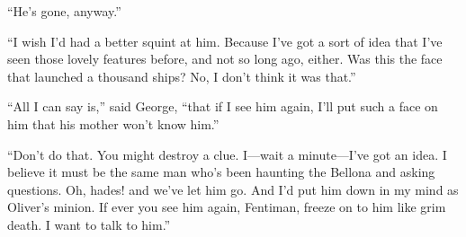 \enquote{He's gone, anyway.}

\enquote{I wish I'd had a better squint at him. Because I've got a sort of idea that I've seen those lovely features before, and not so long ago, either. Was this the face that launched a thousand ships? No, I don't think it was that.}

\enquote{All I can say is,} said George, \enquote{that if I see him again, I'll put such a face on him that his mother won't know him.}

\enquote{Don't do that. You might destroy a clue. I\allowbreak---\allowbreak wait a minute\allowbreak---\allowbreak I've got an idea. I believe it must be the same man who's been haunting the Bellona and asking questions. Oh, hades! and we've let him go. And I'd put him down in my mind as Oliver's minion. If ever you see him again, Fentiman, freeze on to him like grim death. I want to talk to him.}
